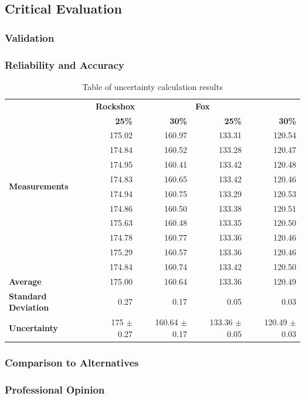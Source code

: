\subsection{Critical Evaluation}
	\subsubsection{Validation}
	\subsubsection{Reliability and Accuracy}
		\begin{table}[h!]
			\centering
			\caption{Table of uncertainty calculation results}
			\label{tab:uncertainty}
		\begin{tabular}{|l|r|r|r|r|}
			\hline
			\multirow{12}{7em}{\bfseries Measurements}&\multicolumn{2}{|l|}{\bfseries Rockshox}&\multicolumn{2}{|l|}{\bfseries Fox}\\
			\cline{2-5}
			&\bfseries 25\%&\bfseries 30\%&\bfseries 25\%&\bfseries 30\%\\
			\hline
			&175.02&160.97&133.31&120.54\\
			&174.84&160.52&133.28&120.47\\
			&174.95&160.41&133.42&120.48\\
			&174.83&160.65&133.42&120.46\\
			&174.94&160.75&133.29&120.53\\
			&174.86&160.50&133.38&120.51\\
			&175.63&160.48&133.35&120.50\\
			&174.78&160.77&133.36&120.46\\
			&175.29&160.57&133.36&120.46\\
			&174.84&160.74&133.42&120.50\\
			\hline
			\bfseries Average&175.00&160.64&133.36&120.49\\
			\bfseries Standard Deviation&0.27&0.17&0.05&0.03\\
			\bfseries Uncertainty&175 $\pm$ 0.27&160.64 $\pm$ 0.17&133.36 $\pm$ 0.05&120.49 $\pm$ 0.03\\
			\hline
		\end{tabular}
		\end{table}
	\subsubsection{Comparison to Alternatives}
	\subsubsection{Professional Opinion}